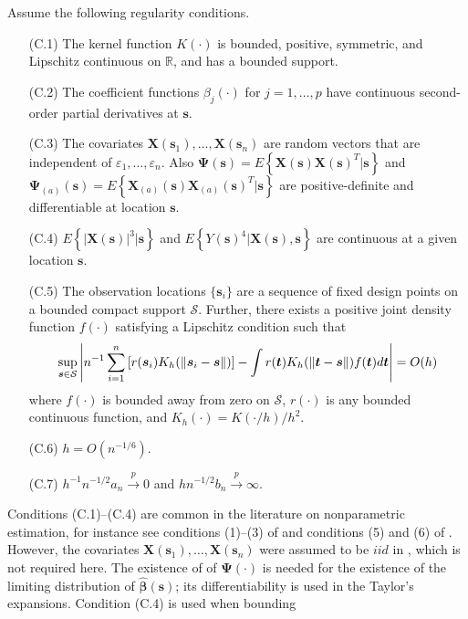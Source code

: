 \documentclass[authoryear,review, 12pt]{elsarticle}
\begin{document}
Assume the following regularity conditions.
\begin{itemize}
\item[(C.1)] The kernel function $K(\cdot)$ is bounded, positive, symmetric,
and Lipschitz continuous on $\mathbb{R}$, and has a bounded support.
\item[(C.2)] The coefficient functions $ $$\beta_{j}(\cdot)$ for $j=1,\dots,p$
have continuous second-order partial derivatives at $\bm{s}$.
\item[(C.3)] The covariates $\bm{X}(\bm{s}_{1}),\dots,\bm{X}(\bm{s}_{n})$ are
random vectors that are independent of $\varepsilon_{1},\dots,\varepsilon_{n}$.
Also $\bm{\Psi}(\bm{s})=E\left\{ \bm{X}(\bm{s})\bm{X}(\bm{s})^{T}|\bm{s}\right\} $
and $\bm{\Psi}_{(a)}(\bm{s})=E\left\{ \bm{X}_{(a)}(\bm{s})\bm{X}_{(a)}(\bm{s})^{T}|\bm{s}\right\} $
are positive-definite and differentiable at location $\bm{s}$.
\item[(C.4)] $E\left\{ \left|\bm{X}(\bm{s})\right|^{3}|\bm{s}\right\} $ and $E\left\{ Y(\bm{s})^{4}|\bm{X}(\bm{s}),\bm{s}\right\} $
are continuous at a given location $\bm{s}$.
\item[(C.5)] The observation locations $\{\bm{s}_{i}\}$ are a sequence of fixed
design points on a bounded compact support $\mathcal{S}$. Further,
there exists a positive joint density function $f(\cdot)$ satisfying
a Lipschitz condition such that 
\[
\sup_{\bm{s}\text{\ensuremath{\in}}\mathcal{S}}\left|n^{-1}\sum_{i=1}^{n}\left[r(\bm{s}_{i})K_{h}(\|\bm{s}_{i}-\bm{s}\|)\right]-\int r(\bm{t})K_{h}(\|\bm{t}-\bm{s}\|)f(\bm{t})d\bm{t}\right|=O(h)
\]
where $f(\cdot)$ is bounded away from zero on $\mathcal{S}$, $r(\cdot)$
is any bounded continuous function, and $K_{h}(\cdot)=K(\cdot/h)/h^{2}$.
\item[(C.6)] $h=O\left(n^{-1/6}\right)$.
\item[(C.7)] $h^{-1}n^{-1/2}a_{n}\xrightarrow{p}0$ and $hn^{-1/2}b_{n}\xrightarrow{p}\infty$.
\end{itemize}
Conditions (C.1)--(C.4) are common in the literature on nonparametric
estimation, for instance see conditions (1)--(3) of \citet{Sun-Yan-Zhang-Lu-2014}
and conditions (5) and (6) of \citet{Cai-Fan-Li-2000}. However, the
covariates $\bm{X}(\bm{s}_{1}),\dots,\bm{X}(\bm{s}_{n})$ were assumed
to be $iid$ in \citet{Sun-Yan-Zhang-Lu-2014}, which is not required
here. The existence of of $\bm{\Psi}(\cdot)$ is needed for the existence
of the limiting distribution of $\hat{\bm{\beta}}(\bm{s})$; its differentiability
is used in the Taylor's expansions. Condition (C.4) is used when bounding
\end{document}
